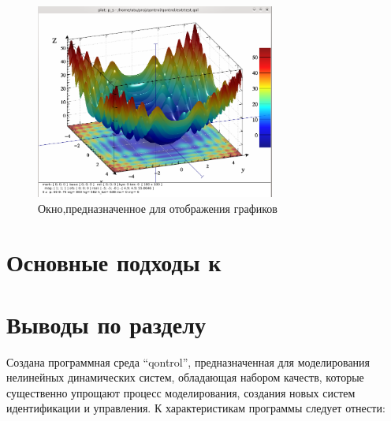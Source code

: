\begin{figure}[htb!]
  \begin{center}
    \includegraphics[width=0.7\textwidth]{p/qontrol_3d_a.png}
  \end{center}
  \caption{Окно,предназначенное для отображения графиков}
  \label{atu:f:qontrol_3d}
\end{figure}

\section{Основные подходы к } %


\section{Выводы по разделу \thechapter} %

Создана программная среда ``qontrol'', предназначенная для моделирования
нелинейных динамических систем, обладающая набором качеств,
которые существенно упрощают процесс моделирования,
создания новых систем идентификации и управления.
К характеристикам программы следует отнести:

